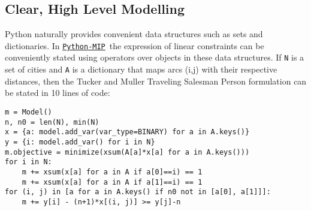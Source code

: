 \documentclass{article}
\def\PythonMIP{\href{https://github.com/coin-or/python-mip}{\texttt{Python-MIP}}}
\begin{document}
\subsection{Clear, High Level Modelling}
Python naturally provides convenient data structures such as sets and dictionaries. In \PythonMIP\ the expression of linear constraints can be conveniently stated using operators over objects in these data structures. If \texttt{N} is a set of cities and \texttt{A} is a dictionary that maps arcs (i,j) with their respective distances, then the Tucker and Muller Traveling Salesman Person formulation can be stated in 10 lines of code:

\begin{verbatim}
m = Model()
n, n0 = len(N), min(N) 
x = {a: model.add_var(var_type=BINARY) for a in A.keys()}
y = {i: model.add_var() for i in N}
m.objective = minimize(xsum(A[a]*x[a] for a in A.keys()))
for i in N:
    m += xsum(x[a] for a in A if a[0]==i) == 1
    m += xsum(x[a] for a in A if a[1]==i) == 1
for (i, j) in [a for a in A.keys() if n0 not in [a[0], a[1]]]:
    m += y[i] - (n+1)*x[(i, j)] >= y[j]-n
\end{verbatim}
\end{document}
